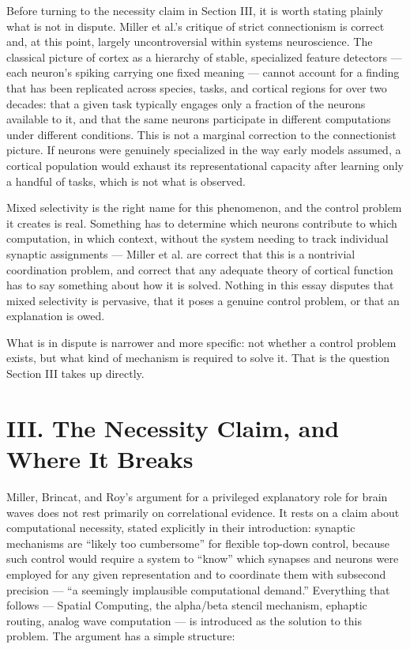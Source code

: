\documentclass[11pt]{article}
\begin{document}
Before turning to the necessity claim in Section III, it is worth stating plainly what is not in dispute. Miller et al.'s critique of strict connectionism is correct and, at this point, largely uncontroversial within systems neuroscience. The classical picture of cortex as a hierarchy of stable, specialized feature detectors — each neuron's spiking carrying one fixed meaning — cannot account for a finding that has been replicated across species, tasks, and cortical regions for over two decades: that a given task typically engages only a fraction of the neurons available to it, and that the same neurons participate in different computations under different conditions. This is not a marginal correction to the connectionist picture. If neurons were genuinely specialized in the way early models assumed, a cortical population would exhaust its representational capacity after learning only a handful of tasks, which is not what is observed.

Mixed selectivity is the right name for this phenomenon, and the control problem it creates is real. Something has to determine which neurons contribute to which computation, in which context, without the system needing to track individual synaptic assignments — Miller et al. are correct that this is a nontrivial coordination problem, and correct that any adequate theory of cortical function has to say something about how it is solved. Nothing in this essay disputes that mixed selectivity is pervasive, that it poses a genuine control problem, or that an explanation is owed.

What is in dispute is narrower and more specific: not whether a control problem exists, but what kind of mechanism is required to solve it. That is the question Section III takes up directly.
\section*{III. The Necessity Claim, and Where It Breaks}

Miller, Brincat, and Roy's argument for a privileged explanatory role for brain waves does not rest primarily on correlational evidence. It rests on a claim about computational necessity, stated explicitly in their introduction: synaptic mechanisms are ``likely too cumbersome'' for flexible top-down control, because such control would require a system to ``know'' which synapses and neurons were employed for any given representation and to coordinate them with subsecond precision — ``a seemingly implausible computational demand.'' Everything that follows — Spatial Computing, the alpha/beta stencil mechanism, ephaptic routing, analog wave computation — is introduced as the solution to this problem. The argument has a simple structure:
\end{document}

